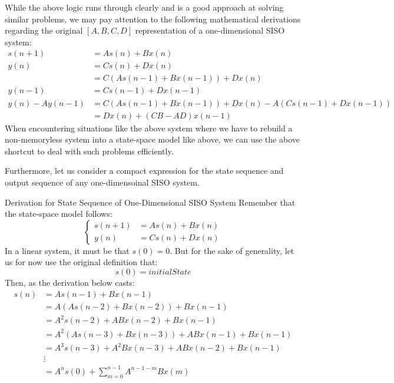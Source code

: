 While the above logic runs through clearly and is a good approach at solving similar problems, we may pay attention to the following mathematical derivations regarding the original $[A, B, C, D]$ representation of a one-dimensional SISO system:
\begin{align*}
    s(n + 1) &= A s(n) + B x(n) \\
    y(n) &= C s(n) + D x(n) \\
    &= C (A s(n - 1) + B x(n - 1)) + D x(n) \\
    y(n - 1) &= C s(n - 1) + D x(n - 1) \\
    y(n) - A y(n - 1)
    &= C (A s(n - 1) + B x(n - 1)) + D x(n) - A (C s(n - 1) + D x(n - 1)) \\
    &= D x(n) + (CB - AD) x(n - 1)
\end{align*}
When encountering situations like the above system where we have to rebuild a non-memoryless system into a state-space model like above, we can use the above shortcut to deal with such problems efficiently.

Furthermore, let us consider a compact expression for the state sequence and output sequence of any one-dimensoinal SISO system.
\begin{ln-example}{Derivation for State Sequence of One-Dimensional SISO System}{}
    Remember that the state-space model follows:
    \[
        \begin{cases}
            s(n + 1) &= A s(n) + B x(n) \\
            y(n) &= C s(n) + D x(n)
        \end{cases}
    \]
    \tcblower
    In a linear system, it must be that $s(0) = 0$. But for the sake of generality, let us for now use the original definition that:
    \[
        s(0) = initialState
    \]
    Then, as the derivation below casts:
    \begin{align*}
        s(n)
        &= A s(n - 1) + B x(n - 1) \\
        &= A(A s(n - 2) + B x(n - 2)) + B x(n - 1) \\
        &= A^2 s(n - 2) + AB x(n - 2) + B x(n - 1) \\
        &= A^2(A s(n - 3) + B x(n - 3)) + AB x(n - 1) + B x(n - 1) \\
        &= A^3 s(n - 3) + A^2 B x(n - 3) + AB x(n - 2) + B x(n - 1) \\
        &\vdots \\
        &= A^n s(0) + \sum_{m = 0}^{n - 1} A^{n - 1 - m} B x(m)
    \end{align*}
\end{ln-example}

